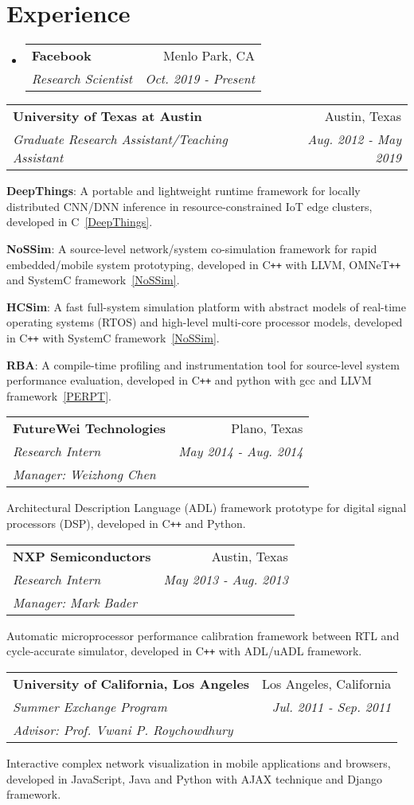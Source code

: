 \documentclass[letterpaper,11pt]{article}
\makeatletter
\def\plusplus{\texttt{++}\xspace}
\newcommand{\resumeItemList}[1]{
{\justifying
  \item{#1 \vspace{-6pt}}
\par}
}
\newcommand{\resumeItem}[2]{
{\justifying
  \item{
    \textbf{#1}{: #2 \vspace{-2pt}}
  }
\par}
}
\newcommand{\resumeSubheading}[4]{
  \vspace{-1pt}\item
    \begin{tabular*}{0.97\textwidth}[t]{l@{\extracolsep{\fill}}r}
      \textbf{#1} & #2 \\
      \textit{#3} & \textit{ #4} \\
    \end{tabular*}\vspace{-5pt}
}
\newcommand{\resumeSubheadingList}[5]{
  \vspace{-1pt}\item
    \begin{tabular*}{0.97\textwidth}[t]{l@{\extracolsep{\fill}}r}
      \textbf{#1} & #2 \\
      \textit{#3} & \textit{ #4} \\
      \textit{#5} &  \\
    \end{tabular*}\vspace{-5pt}
}
\newcommand{\resumeSubHeadingListStart}{\begin{itemize}[leftmargin=*]}
\newcommand{\resumeSubHeadingListEnd}{\end{itemize}}
\newcommand{\resumeItemListStart}{\begin{itemize}}
\newcommand{\resumeItemListEnd}{\end{itemize}\vspace{-5pt}}
\makeatother
\begin{document}
\section{Experience}
  \resumeSubHeadingListStart
    \resumeSubheading
      {Facebook}{Menlo Park, CA}
      {Research Scientist}{Oct. 2019 - Present}
  \resumeSubHeadingListEnd
\vspace{-5pt}
  \resumeSubHeadingListStart
    \resumeSubheading
      {University of Texas at Austin}{Austin, Texas}
      {Graduate Research Assistant/Teaching Assistant}{Aug. 2012 - May 2019}
      \resumeItemListStart
        \resumeItem{DeepThings}
          {A portable and lightweight runtime framework for locally distributed CNN/DNN inference in resource-constrained IoT edge clusters, developed in C~\ref{DeepThings}.}
        \resumeItem{NoSSim}
          {A source-level network/system co-simulation framework for rapid embedded/mobile system prototyping, developed in C\plusplus with LLVM, OMNeT\plusplus and SystemC framework~\ref{NoSSim}.}
        \resumeItem{HCSim}
          {A fast full-system simulation platform with abstract models of real-time operating systems (RTOS) and high-level multi-core processor models, developed in C\plusplus with SystemC framework~\ref{NoSSim}.}
        \resumeItem{RBA}
          {A compile-time profiling and instrumentation tool for source-level system performance evaluation, developed in C\plusplus and python with gcc and LLVM framework~\ref{PERPT}.}
      \resumeItemListEnd
  \resumeSubHeadingListEnd
\vspace{-5pt}
  \resumeSubHeadingListStart
    \resumeSubheadingList
      {FutureWei Technologies}{Plano, Texas}
      {Research Intern}{May 2014 - Aug. 2014}
      {Manager: Weizhong Chen}
      \resumeItemListStart
        \resumeItemList{Architectural Description Language (ADL) framework prototype for digital signal processors (DSP), developed in C\plusplus and Python.}
      \resumeItemListEnd
  \resumeSubHeadingListEnd
\vspace{-5pt}
  \resumeSubHeadingListStart
    \resumeSubheadingList
      {NXP Semiconductors}{Austin, Texas}
      {Research Intern}{May 2013 - Aug. 2013}
      {Manager: Mark Bader}
      \resumeItemListStart
        \resumeItemList{Automatic microprocessor performance calibration framework between RTL and cycle-accurate simulator, developed in C\plusplus with ADL/uADL framework.}
      \resumeItemListEnd
  \resumeSubHeadingListEnd
\vspace{-5pt}
  \resumeSubHeadingListStart
    \resumeSubheadingList
      {University of California, Los Angeles}{Los Angeles, California}
      {Summer Exchange Program}{Jul. 2011 - Sep. 2011}
      {Advisor: Prof. Vwani P. Roychowdhury}
      \resumeItemListStart
        \resumeItemList{Interactive complex network visualization in mobile applications and browsers, developed in JavaScript, Java and Python with AJAX technique and Django framework.}
      \resumeItemListEnd
  \resumeSubHeadingListEnd
\end{document}
